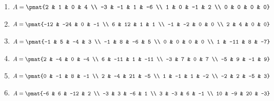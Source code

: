 \begin{enumerate}
\item

\begin{align*}
A = \pmat{2 & 1 & 0 & 4 \\ -3 & -1 & 1 & -6 \\ 1 & 0 & -1 & 2 \\ 0 & 0 & 0 & 0}
\end{align*}

\item

\begin{align*}
A = \pmat{-12 & -24 & 0 & -1 \\ 6 & 12 & 1 & 1 \\ -1 & -2 & 0 & 0 \\ 2 & 4 & 0 & 0}
\end{align*}

\item

\begin{align*}
A = \pmat{-1 & 5 & -4 & 3 \\ -1 & 8 & -6 & 5 \\ 0 & 0 & 0 & 0 \\ 1 & -11 & 8 & -7}
\end{align*}

\item

\begin{align*}
A = \pmat{2 & -4 & 0 & -4 \\ 6 & -11 & 1 & -11 \\ -3 & 7 & 0 & 7 \\ -5 & 9 & -1 & 9}
\end{align*}

\item

\begin{align*}
A = \pmat{0 & -1 & 8 & -1 \\ 2 & -4 & 21 & -5 \\ 1 & -1 & 1 & -2 \\ -2 & 2 & -5 & 3}
\end{align*}

\item

\begin{align*}
A = \pmat{-6 & 6 & -12 & 2 \\ -3 & 3 & -6 & 1 \\ 3 & -3 & 6 & -1 \\ 10 & -9 & 20 & -3}
\end{align*}


\end{enumerate}
